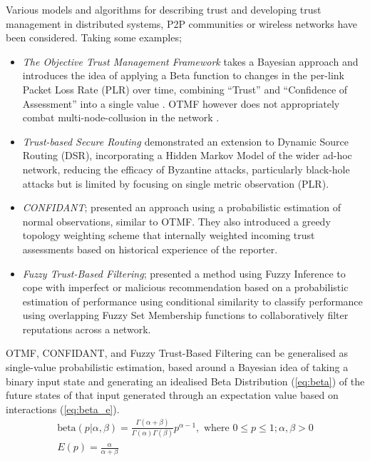 Various models and algorithms for describing trust and developing trust management in distributed systems, P2P communities or wireless networks have been considered.
Taking some examples;

\begin{itemize}
  \item \emph{The Objective Trust Management Framework} takes a Bayesian approach and introduces the idea of applying a Beta function to changes in the per-link Packet Loss Rate (PLR) over time, combining ``Trust'' and ``Confidence of Assessment'' into a single value \cite{Li2008}.
    OTMF however does not appropriately combat multi-node-collusion in the network \cite{Cho2011}.
  \item \emph{Trust-based Secure Routing \cite{Moe2008a}} demonstrated an extension to Dynamic Source Routing (DSR), incorporating a Hidden Markov Model of the wider ad-hoc network, reducing the efficacy of Byzantine attacks, particularly black-hole attacks but is limited by focusing on single metric observation (PLR)\cite{Cho2011}.
  \item \emph{CONFIDANT}; \cite{Buchegger2002} presented an approach using a probabilistic estimation of normal observations, similar to OTMF. They also introduced a greedy topology weighting scheme that internally weighted incoming trust assessments based on historical experience of the reporter.
  \item \emph{Fuzzy Trust-Based Filtering}; \cite{Luo2008} presented a method using Fuzzy Inference to cope with imperfect or malicious recommendation based on a probabilistic estimation of performance using conditional similarity to classify performance using overlapping Fuzzy Set Membership functions to collaboratively filter reputations across a network.
\end{itemize}

OTMF, CONFIDANT, and Fuzzy Trust-Based Filtering can be generalised as single-value probabilistic estimation, based around a Bayesian idea of taking a binary input state and generating an idealised Beta Distribution (\ref{eq:beta}) of the future states of that input generated through an expectation value based on interactions (\ref{eq:beta_e}).
\begin{align}
  \label{eq:beta}
  \text{beta}(p|\alpha,\beta) = \frac{\Gamma(\alpha + \beta)}{\Gamma(\alpha)\Gamma(\beta)}p^{\alpha-1},\text{ where } 0 \leq p \leq 1; \alpha,\beta > 0\\
  \label{eq:beta_e}
  E(p) = \frac{\alpha}{\alpha + \beta}
\end{align}

